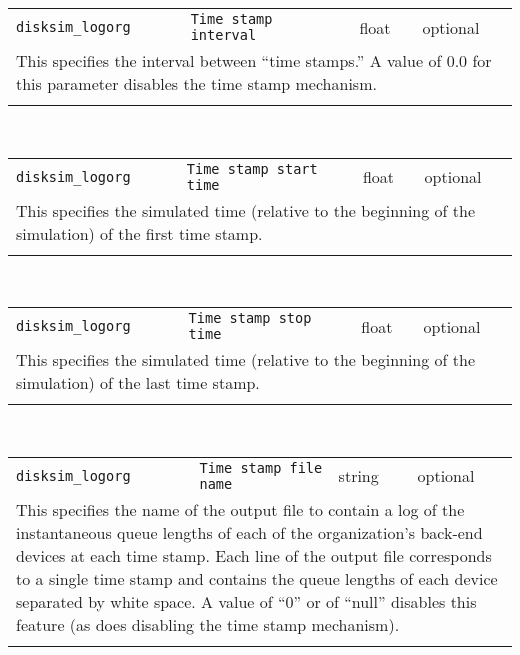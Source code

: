 \noindent 
\begin{tabular}{|p{\lpmodwidth}|p{\lpnamewidth}|p{0.5in}|p{0.5in}|}
\cline{1-4}
\texttt{disksim\_logorg} & \texttt{Time stamp interval} & float & optional \\ 
\cline{1-4}
\multicolumn{4}{|p{6in}|}{
This specifies the interval between ``time stamps.'' A value of $0.0$ for
this parameter disables the time stamp mechanism.
}\\ 
\cline{1-4}
\multicolumn{4}{p{5in}}{}\\
\end{tabular}\\ 
\noindent 
\begin{tabular}{|p{\lpmodwidth}|p{\lpnamewidth}|p{0.5in}|p{0.5in}|}
\cline{1-4}
\texttt{disksim\_logorg} & \texttt{Time stamp start time} & float & optional \\ 
\cline{1-4}
\multicolumn{4}{|p{6in}|}{
This specifies the simulated time (relative to the beginning of the
simulation) of the first time stamp.
}\\ 
\cline{1-4}
\multicolumn{4}{p{5in}}{}\\
\end{tabular}\\ 
\noindent 
\begin{tabular}{|p{\lpmodwidth}|p{\lpnamewidth}|p{0.5in}|p{0.5in}|}
\cline{1-4}
\texttt{disksim\_logorg} & \texttt{Time stamp stop time} & float & optional \\ 
\cline{1-4}
\multicolumn{4}{|p{6in}|}{
This specifies the simulated time (relative to the beginning of the
simulation) of the last time stamp.
}\\ 
\cline{1-4}
\multicolumn{4}{p{5in}}{}\\
\end{tabular}\\ 
\noindent 
\begin{tabular}{|p{\lpmodwidth}|p{\lpnamewidth}|p{0.5in}|p{0.5in}|}
\cline{1-4}
\texttt{disksim\_logorg} & \texttt{Time stamp file name} & string & optional \\ 
\cline{1-4}
\multicolumn{4}{|p{6in}|}{
This specifies the name of the output file to contain a log of the
instantaneous queue lengths of each of the organization's back-end
devices at each time stamp. Each line of the output file corresponds
to a single time stamp and contains the queue lengths of each device
separated by white space. A value of ``0'' or of ``null'' disables
this feature (as does disabling the time stamp mechanism).
}\\ 
\cline{1-4}
\multicolumn{4}{p{5in}}{}\\
\end{tabular}\\ 
